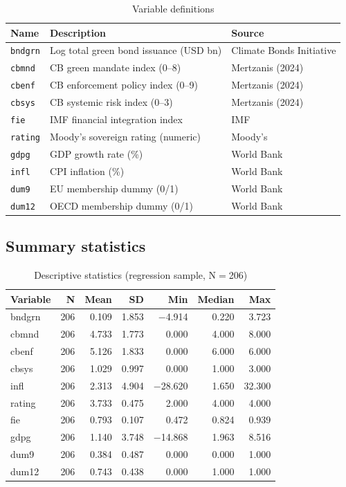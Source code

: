\documentclass[12pt,a4paper]{article}
\begin{document}
\begin{table}[H]
\centering
\caption{Variable definitions}
\label{tab:vars}
\begin{tabular}{p{2.1cm}p{5.8cm}p{3.8cm}}
\toprule
Name & Description & Source \\
\midrule
\texttt{bndgrn} & Log total green bond issuance (USD bn) & Climate Bonds Initiative \\
\texttt{cbmnd}  & CB green mandate index (0--8) & Mertzanis (2024) \\
\texttt{cbenf}  & CB enforcement policy index (0--9) & Mertzanis (2024) \\
\texttt{cbsys}  & CB systemic risk index (0--3) & Mertzanis (2024) \\
\texttt{fie}    & IMF financial integration index & IMF \\
\texttt{rating} & Moody's sovereign rating (numeric) & Moody's \\
\texttt{gdpg}   & GDP growth rate (\%) & World Bank \\
\texttt{infl}   & CPI inflation (\%) & World Bank \\
\texttt{dum9}   & EU membership dummy (0/1) & World Bank \\
\texttt{dum12}  & OECD membership dummy (0/1) & World Bank \\
\bottomrule
\end{tabular}
\end{table}

\subsection{Summary statistics}

\begin{table}[H]
\centering
\caption{Descriptive statistics (regression sample, N$=$206)}
\label{tab:sumstats}
\begin{tabular}{lrrrrrr}
\toprule
Variable & N & Mean & SD & Min & Median & Max \\
\midrule
bndgrn  & 206 & 0.109 & 1.853 & $-$4.914 &  0.220 &  3.723 \\
cbmnd   & 206 & 4.733 & 1.773 &    0.000 &  4.000 &  8.000 \\
cbenf   & 206 & 5.126 & 1.833 &    0.000 &  6.000 &  6.000 \\
cbsys   & 206 & 1.029 & 0.997 &    0.000 &  1.000 &  3.000 \\
infl    & 206 & 2.313 & 4.904 & $-$28.620 & 1.650 & 32.300 \\
rating  & 206 & 3.733 & 0.475 &    2.000 &  4.000 &  4.000 \\
fie     & 206 & 0.793 & 0.107 &    0.472 &  0.824 &  0.939 \\
gdpg    & 206 & 1.140 & 3.748 & $-$14.868 & 1.963 &  8.516 \\
dum9    & 206 & 0.384 & 0.487 &    0.000 &  0.000 &  1.000 \\
dum12   & 206 & 0.743 & 0.438 &    0.000 &  1.000 &  1.000 \\
\bottomrule
\end{tabular}
\end{table}
\end{document}
